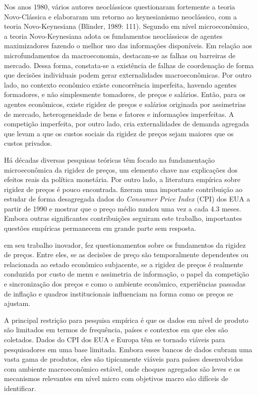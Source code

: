 Nos anos 1980, vários autores neoclássicos  questionaram fortemente a teoria Novo-Clássica e elaboraram um retorno ao keynesianismo neoclássico, com a teoria Novo-Keynesiana (Blinder, 1989: 111). Segundo \citet{datheinintroduccao} em nível microeconômico, a teoria Novo-Keynesiana adota os fundamentos neoclássicos de agentes maximizadores fazendo o melhor uso das informações disponíveis. Em relação aos microfundamentos da macroeconomia, destacam-se as falhas ou barreiras de mercado. Dessa forma, constata-se a existência de falhas de coordenação de forma que decisões individuais podem gerar externalidades macroeconômicas. Por outro lado, no contexto econômico existe concorrência imperfeita, havendo agentes formadores, e não simplesmente tomadores, de preços e salários. Então, para os agentes econômicos, existe rigidez de preços e salários originada por assimetrias de mercado, heterogeneidade de bens e fatores e informações imperfeitas. A competição imperfeita, por outro lado, cria externalidades de demanda agregada que levam a que os custos sociais da rigidez de preços sejam maiores que os custos privados. 

Há décadas diversas pesquisas teóricas têm focado na fundamentação microeconômica da rigidez de preços, um elemento chave nas explicações dos efeitos reais da política monetária. Por outro lado, a literatura empírica sobre rigidez de preços é pouco encontrada. \citet{bils2004some} fizeram uma importante contribuição ao estudar de forma desagregada dados do \emph{Consumer Price Index} (CPI) dos EUA a partir de 1990 e mostrar que o preço médio mudou uma vez a cada 4.3 meses. Embora outras significantes contribuições seguiram este trabalho, importantes questões empíricas permanecem em grande parte sem resposta.

\citet{cavallo2010scraped} em seu trabalho inovador, fez questionamentos sobre os fundamentos da rigidez de preços. Entre eles, se as decisões de preço são temporalmente dependentes ou relacionada ao estado econômico subjacente, se a rigidez de preços é realmente conduzida por custo de menu e assimetria de informação, o papel da competição e sincronização dos preços e como o ambiente econômico, experiências passadas de inflação e quadros institucionais influenciam na forma como os preços se ajustam.

A principal restrição para pesquisa empírica é que os dados em nível de produto são limitados em termos de frequência, países e contextos em que eles são coletados. Dados do CPI dos EUA e Europa têm se tornado viáveis para pesquisadores em uma base limitada. Embora esses bancos de dados cubram uma vasta gama de produtos, eles são tipicamente viáveis para países desenvolvidos com ambiente macroeconômico estável, onde choques agregados são leves e os mecanismos relevantes em nível micro com objetivos macro são difíceis de identificar. 


